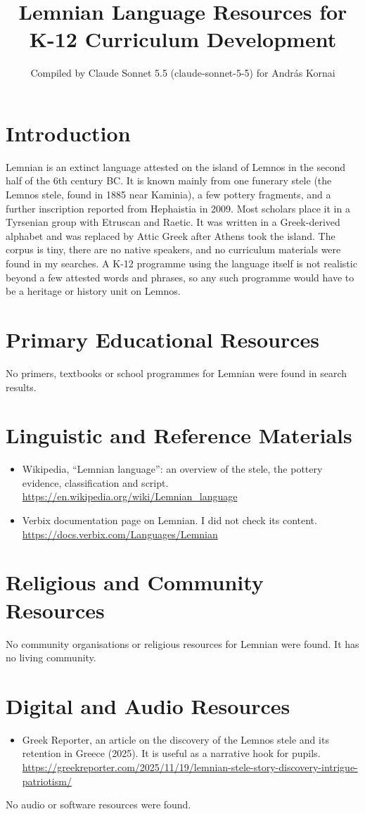 \documentclass[12pt]{article}
\title{Lemnian Language Resources for K-12 Curriculum Development}
\author{Compiled by Claude Sonnet 5.5 (claude-sonnet-5-5) for Andr\'as Kornai}
\date{}
\begin{document}
\maketitle

\section{Introduction}
Lemnian is an extinct language attested on the island of Lemnos in the second half of the 6th century BC. It is known mainly from one funerary stele (the Lemnos stele, found in 1885 near Kaminia), a few pottery fragments, and a further inscription reported from Hephaistia in 2009. Most scholars place it in a Tyrsenian group with Etruscan and Raetic. It was written in a Greek-derived alphabet and was replaced by Attic Greek after Athens took the island. The corpus is tiny, there are no native speakers, and no curriculum materials were found in my searches. A K-12 programme using the language itself is not realistic beyond a few attested words and phrases, so any such programme would have to be a heritage or history unit on Lemnos.

\section{Primary Educational Resources}
No primers, textbooks or school programmes for Lemnian were found in search results.

\section{Linguistic and Reference Materials}
\begin{itemize}
\item Wikipedia, ``Lemnian language'': an overview of the stele, the pottery evidence, classification and script. \url{https://en.wikipedia.org/wiki/Lemnian_language}
\item Verbix documentation page on Lemnian. I did not check its content. \url{https://docs.verbix.com/Languages/Lemnian}
\end{itemize}

\section{Religious and Community Resources}
No community organisations or religious resources for Lemnian were found. It has no living community.

\section{Digital and Audio Resources}
\begin{itemize}
\item Greek Reporter, an article on the discovery of the Lemnos stele and its retention in Greece (2025). It is useful as a narrative hook for pupils. \url{https://greekreporter.com/2025/11/19/lemnian-stele-story-discovery-intrigue-patriotism/}
\end{itemize}
No audio or software resources were found.
\end{document}
